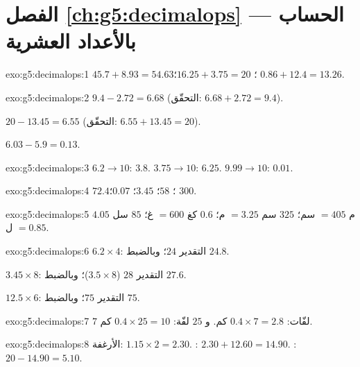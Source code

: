 \section*{الفصل \ref{ch:g5:decimalops} --- الحساب بالأعداد العشرية}

\begin{solution}{exo:g5:decimalops:1}
$45.7 + 8.93 = 54.63$؛ \quad
$16.25 + 3.75 = 20$؛ \quad
$0.86 + 12.4 = 13.26$.
\end{solution}

\begin{solution}{exo:g5:decimalops:2}
$9.4 - 2.72 = 6.68$ (التحقّق: $6.68 + 2.72 = 9.4$).

$20 - 13.45 = 6.55$ (التحقّق: $6.55 + 13.45 = 20$).

$6.03 - 5.9 = 0.13$.
\end{solution}

\begin{solution}{exo:g5:decimalops:3}
$6.2 \to 10$: $3.8$. \quad $3.75 \to 10$: $6.25$. \quad
$9.99 \to 10$: $0.01$.
\end{solution}

\begin{solution}{exo:g5:decimalops:4}
$72.4$؛ \quad $58$؛ \quad $3.45$؛ \quad $0.07$؛ \quad $300$.
\end{solution}

\begin{solution}{exo:g5:decimalops:5}
$4.05$ م $= 405$ سم؛ \quad $325$ سم $= 3.25$ م؛ \quad
$0.6$ كغ $= 600$ غ؛ \quad $85$ سل $= 0.85$ ل.
\end{solution}

\begin{solution}{exo:g5:decimalops:6}
$6.2 \times 4$: التقدير $24$؛ وبالضبط $24.8$.

$3.45 \times 8$: التقدير $28$ ($3.5 \times 8$)؛ وبالضبط $27.6$.

$12.5 \times 6$: التقدير $75$؛ وبالضبط $75$.
\end{solution}

\begin{solution}{exo:g5:decimalops:7}
$7$ لفّات: $0.4 \times 7 = 2.8$ كم. و $25$ لفّة:
$0.4 \times 25 = 10$ كم.
\end{solution}

\begin{solution}{exo:g5:decimalops:8}
الأرغفة: $1.15 \times 2 = 2.30$. : $2.30 + 12.60 = 14.90$.
: $20 - 14.90 = 5.10$.
\end{solution}

